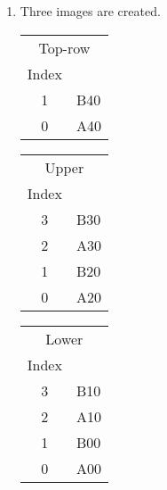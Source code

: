 \documentclass[12pt]{report}
\begin{document}
\begin{figure}[H]
\begin{mdframed}[style=default]
\begin{enumerate}
\item Three images are created.
\begin{center}
\begin{tabular}{cl}
\multicolumn{2}{c}{Top-row}\\
Index &\ \\
\hline
1 & B40\\
0 & A40\\
\end{tabular}
\end{center}
\begin{center}
\begin{tabular}{cl}
\multicolumn{2}{c}{Upper}\\
Index &\ \\
\hline
3 & B30\\
2 & A30\\
1 & B20\\
0 & A20\\
\end{tabular}
\end{center}
\begin{center}
\begin{tabular}{cl}
\multicolumn{2}{c}{Lower}\\
Index &\ \\
\hline
3 & B10\\
2 & A10\\
1 & B00\\
0 & A00\\
\end{tabular}
\end{center}


\end{enumerate}
\end{mdframed}
\end{figure}
\end{document}
